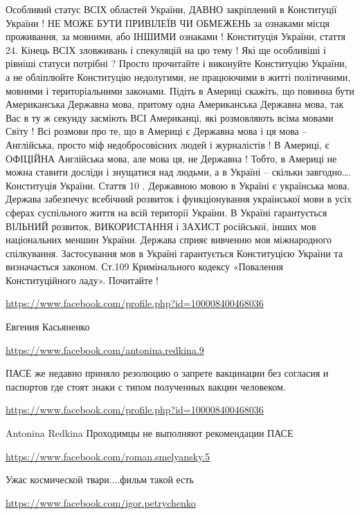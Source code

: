 \documentclass[a4paper,11pt]{extreport}
\begin{document}
\begin{itemize}
Особливий статус ВСІХ областей України, ДАВНО закріплений в Конституції України ! НЕ МОЖЕ БУТИ ПРИВІЛЕЇВ ЧИ ОБМЕЖЕНЬ за ознаками місця проживання, за мовними, або ІНШИМИ ознаками ! Конституція України, стаття 24. Кінець ВСІХ зловживань і спекуляцій на цю тему ! Які ще особливіші і рівніші статуси потрібні ? Просто прочитайте і виконуйте Конституцію України, а не обліплюйте Конституцію недолугими, не працюючими в житті політичними, мовними і територіальними законами. Підіть в Америці скажіть, що повинна бути Американська Державна мова, притому одна Американська Державна мова, так Вас в ту ж секунду засміють ВСІ Американці, які розмовляють всіма мовами Світу ! Всі розмови про те, що в Америці є Державна мова і ця мова – Англійська, просто міф недобросовісних людей і журналістів ! В Америці, є ОФІЦІЙНА Англійська мова, але мова ця, не Державна ! Тобто, в Америці не можна ставити досліди і знущатися над людьми, а в Україні – скільки завгодно….
Конституція України. Стаття 10 . Державною мовою в Україні є українська мова.
Держава забезпечує всебічний розвиток і функціонування української мови в усіх сферах суспільного життя на всій території України.
В Україні гарантується ВІЛЬНИЙ розвиток, ВИКОРИСТАННЯ і ЗАХИСТ російської, інших мов національних меншин України.
Держава сприяє вивченню мов міжнародного спілкування.
Застосування мов в Україні гарантується Конституцією України та визначається законом.
Ст.109 Кримінального кодексу «Повалення Конституційного ладу». Почитайте !

\url{https://www.facebook.com/profile.php?id=100008400468036}

Евгения Касьяненко

\begin{itemize}
\url{https://www.facebook.com/antonina.redkina.9}

ПАСЕ же недавно приняло резолюцию о запрете вакцинации без согласия и паспортов где стоят знаки с типом полученных вакцин человеком.

\url{https://www.facebook.com/profile.php?id=100008400468036}

Antonina Redkina Проходимцы не выполняют рекомендации ПАСЕ

\end{itemize}
\url{https://www.facebook.com/roman.smelyansky.5}

Ужас космической твари....фильм такой есть

\url{https://www.facebook.com/igor.petrychenko}


\end{itemize}
\end{document}
